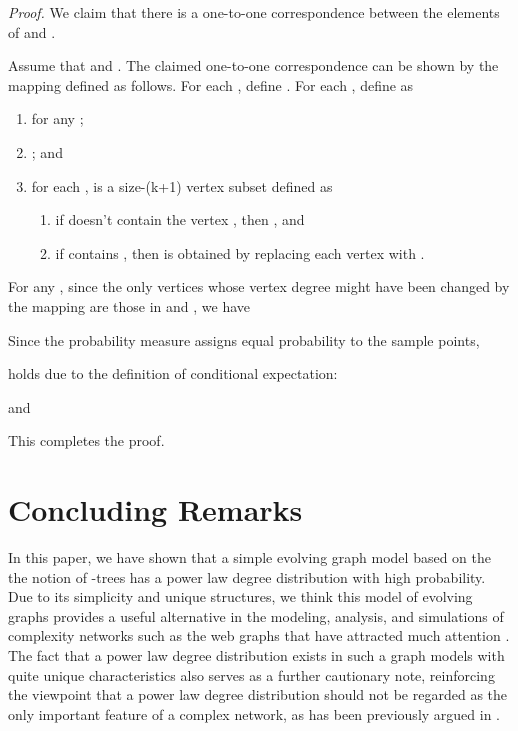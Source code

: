 \documentclass[11pt]{article}
\newenvironment{proof}[0]{\textit{Proof.} }{\hfill   }
\begin{document}
\begin{proof}
We claim that there is a one-to-one correspondence between the elements of
 and .

Assume that  and
.
The claimed one-to-one correspondence
can be shown by the mapping defined as follows. For each , define
. For each , define  as
\begin{enumerate}
\item  for any ;
\item ; and
\item for each ,  is a size-(k+1) vertex subset defined as
\begin{enumerate}
\item if  doesn't contain the vertex , then , and
\item if  contains , then  is obtained by replacing
 each vertex  with .
\end{enumerate}
\end{enumerate}
For any , since the only vertices whose vertex degree might have been changed by the
mapping  are those
in  and , we have



Since the probability measure  assigns equal probability  to the sample points,

holds due to the definition of conditional expectation:

and

This completes the proof.
\end{proof}

\section{Concluding Remarks}
In this paper, we have shown that a simple evolving graph model based on the the notion of -trees has a power law degree distribution with high probability. Due to its simplicity and unique structures, we think this model of evolving graphs provides a useful alternative in the modeling, analysis, and simulations of complexity networks such as the web graphs that have attracted much attention \cite{chakrabarti06}.  The fact that    
a power law degree distribution exists in such a graph models with quite unique characteristics
also serves as a further cautionary note, reinforcing the viewpoint that a power law degree 
distribution should not be regarded as the only important feature of a complex network, as has been previously argued in \cite{dimitris05power,li05,mitzenmacher05}.                
      
\end{document}
